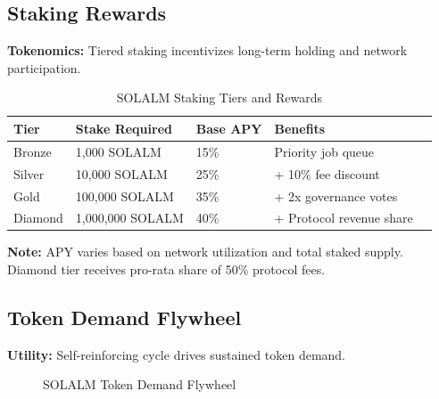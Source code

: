 \documentclass[11pt,a4paper]{article}
\begin{document}
\subsection{Staking Rewards}

\textbf{Tokenomics:} Tiered staking incentivizes long-term holding and network participation.

\begin{table}[H]
\centering
\begin{tabular}{@{}lllll@{}}
\toprule
\textbf{Tier} & \textbf{Stake Required} & \textbf{Base APY} & \textbf{Benefits} \\
\midrule
Bronze & 1,000 SOLALM & 15\% & Priority job queue \\
Silver & 10,000 SOLALM & 25\% & + 10\% fee discount \\
Gold & 100,000 SOLALM & 35\% & + 2x governance votes \\
Diamond & 1,000,000 SOLALM & 40\% & + Protocol revenue share \\
\bottomrule
\end{tabular}
\caption{SOLALM Staking Tiers and Rewards}
\end{table}

\textbf{Note:} APY varies based on network utilization and total staked supply. Diamond tier receives pro-rata share of 50\% protocol fees.

\subsection{Token Demand Flywheel}

\textbf{Utility:} Self-reinforcing cycle drives sustained token demand.

\begin{figure}[H]
\centering
{}
\caption{SOLALM Token Demand Flywheel}
\end{figure}
\end{document}
